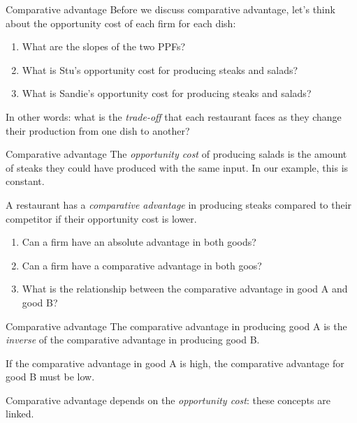 \documentclass[aspectratio=169]{beamer}
\begin{document}
\begin{frame}{Comparative advantage}
   Before we discuss comparative advantage, let's think about the opportunity cost of each firm for each dish:
   \begin{enumerate}
    \item What are the slopes of the two PPFs?
    \item What is Stu's opportunity cost for producing steaks and salads?
    \item What is Sandie's opportunity cost for producing steaks and salads?
   \end{enumerate}
   In other words: what is the \textit{trade-off} that each restaurant faces as they change their production from one dish to another?
\end{frame} 

\begin{frame}{Comparative advantage}
    The \textit{opportunity cost} of producing salads is the amount of steaks they could have produced with the same input. In our example, this is constant.

    \medskip

    A restaurant has a \textit{comparative advantage} in producing steaks compared to their competitor if their opportunity cost is lower.

    \medskip

    \begin{enumerate}
        \item Can a firm have an absolute advantage in both goods?
        \item Can a firm have a comparative advantage in both goos?
        \item What is the relationship between the comparative advantage in good A and good B?
    \end{enumerate}
\end{frame} 

\begin{frame}{Comparative advantage}
    The comparative advantage in producing good A is the \textit{inverse} of the comparative advantage in producing good B.
    
    \medskip

    If the comparative advantage in good A is high, the comparative advantage for good B must be low.

    \medskip

    Comparative advantage depends on the \textit{opportunity cost}: these concepts are linked.
\end{frame} 
\end{document}
